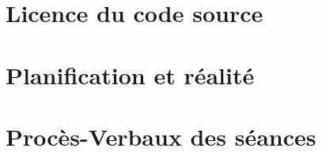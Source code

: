 \documentclass[
    reds, %
    ie, %
]{heig-tb}
\begin{document}
\appendix
\appendixpage
\addappheadtotoc

\chapter{Licence du code source}

\chapter{Planification et réalité}

\chapter{Procès-Verbaux des séances}



\let\cleardoublepage\clearpage
\backmatter
\label{glossaire}
\printnoidxglossary
\printbibliography
\label{index}
\printindex
\end{document}
